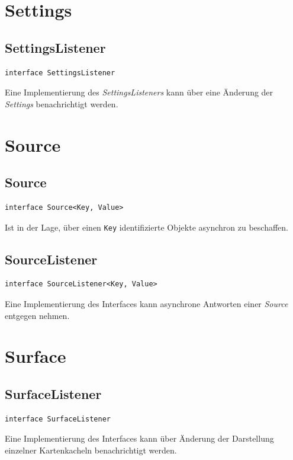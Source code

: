 \documentclass[10pt]{scrreprt}
\begin{document}
\vspace{5mm}
\section{Settings}
\subsection*{SettingsListener}
\begin{lstlisting}
interface SettingsListener
\end{lstlisting}
Eine Implementierung des \textit{SettingsListeners} kann über eine Änderung der \textit{Settings} benachrichtigt werden.\\


\vspace{5mm}
\section{Source}
\subsection*{Source}
\begin{lstlisting}
interface Source<Key, Value>
\end{lstlisting}
Ist in der Lage, über einen \texttt{Key} identifizierte Objekte asynchron zu beschaffen.\\

\vspace{5mm}
\subsection*{SourceListener}
\begin{lstlisting}
interface SourceListener<Key, Value>
\end{lstlisting}
Eine Implementierung des Interfaces kann asynchrone Antworten einer \textit{Source} entgegen nehmen.\\


\vspace{5mm}
\section{Surface}
\subsection*{SurfaceListener}
\begin{lstlisting}
interface SurfaceListener
\end{lstlisting}
Eine Implementierung des Interfaces kann über Änderung der Darstellung einzelner Kartenkacheln benachrichtigt werden.\\
\end{document}
